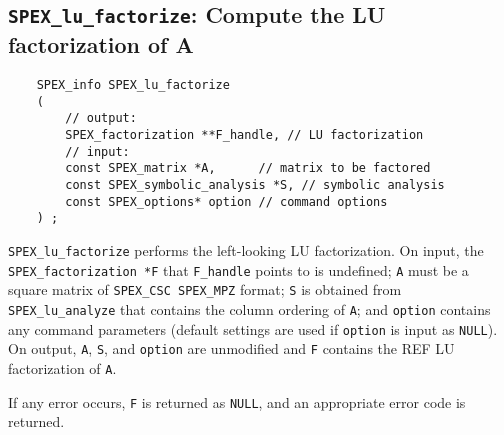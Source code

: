 \documentclass[12pt,oneside]{book}
\theoremstyle{definition}
\begin{document}
\subsection{\texttt{SPEX\_lu\_factorize}: Compute the LU factorization of A} \label{ss:spex_left_lu_factorize}
\begin{mdframed}[userdefinedwidth=\textwidth]
{\footnotesize
\begin{verbatim}
    SPEX_info SPEX_lu_factorize
    (
        // output:
        SPEX_factorization **F_handle, // LU factorization
        // input:
        const SPEX_matrix *A,      // matrix to be factored
        const SPEX_symbolic_analysis *S, // symbolic analysis
        const SPEX_options* option // command options
    ) ;
\end{verbatim}
} \end{mdframed}

\verb|SPEX_lu_factorize| performs the left-looking LU factorization. On input, the \linebreak
\verb|SPEX_factorization *F| that \verb|F_handle| points to is undefined; \verb|A| must be a square matrix of \verb|SPEX_CSC SPEX_MPZ| format; \verb|S| is obtained from \verb|SPEX_lu_analyze| that contains the column ordering of \verb|A|; and \verb|option| contains any command parameters (default settings are used if
\verb|option| is input as \verb|NULL|). On output, \verb|A|, \verb|S|, and \verb|option| are unmodified and \verb|F|  contains the REF LU factorization of \verb|A|.

If any error occurs, \verb|F| is returned as \verb|NULL|, and an appropriate error code is returned.


\newpage
\end{document}
